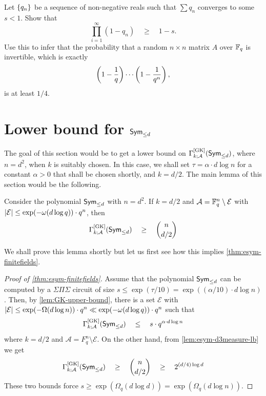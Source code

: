 \begin{exercise}
  Let $\left\{q_n\right\}$ be a sequence of non-negative reals such that $\sum q_n$ converges to some $s < 1$. 
Show that 
  \[
  \prod_{i=1}^{\infty} (1 - q_n) \quad \geq \quad 1 - s. 
  \]
  Use this to infer that the probability that a random $n\times n$ matrix $A$ over $\mathbb{F}_q$ is invertible, which is exactly
  \[
  \left(1 - \frac{1}{q}\right)\cdots \left(1 - \frac{1}{q^{n}}\right),
  \]
  is at least $1/4$. 
\end{exercise}

\section{Lower bound for $\operatorname{\mathsf{Sym}}_{\leq d}$}

The goal of this section would be to get a lower bound on $\Gamma^{\mathrm{[GK]}}_{k;\mathcal{A}}(\operatorname{\mathsf{Sym}}_{\leq d})$, where $n = d^2$, when $k$ is suitably chosen. In this case, we shall set $\tau = \alpha \cdot d \log n$ for a constant $\alpha>0$ that shall be chosen shortly, and $k = d/2$. The main lemma of this section would be the following. 

\begin{lemma}\label{lem:esym-d3measure-lb}
Consider the polynomial $\operatorname{\mathsf{Sym}}_{\leq d}$ with $n = d^2$. If $k = d/2$ and $\mathcal{A} = \mathbb{F}_q^n \setminus \mathcal{E}$ with $\left|\mathcal{E}\right| \leq \exp(-\omega(d\log q)) \cdot  q^n$, then
\[
\Gamma^{\mathrm{[GK]}}_{k;\mathcal{A}}(\operatorname{\mathsf{Sym}}_{\leq d}) \quad \geq \quad \binom{n}{d/2}
\]
\end{lemma}

\noindent
We shall prove this lemma shortly but let us first see how this implies \autoref{thm:esym-finitefields}. 

\begin{proof}[Proof of \autoref{thm:esym-finitefields}]
Assume that the polynomial $\operatorname{\mathsf{Sym}}_{\leq d}$ can be computed by a $\Sigma\Pi\Sigma$ circuit of size $s \leq \exp(\tau/10) = \exp((\alpha/10) \cdot d \log n)$. Then, by \autoref{lem:GK-upper-bound}, there is a set $\mathcal{E}$ with $\left|\mathcal{E}\right| \leq \exp(-\Omega(d\log n)) \cdot q^n \ll \exp(-\omega(d \log q)) \cdot q^n$ such that
\[
\Gamma^{\mathrm{[GK]}}_{k;\mathcal{A}}(\operatorname{\mathsf{Sym}}_{\leq d}) \quad \leq \quad s \cdot q^{\alpha\cdot d\log n}
\]
where $k = d/2$ and $\mathcal{A} = F_q^n \setminus \mathcal{E}$. On the other hand, from \autoref{lem:esym-d3measure-lb} we get
\[
\Gamma^{\mathrm{[GK]}}_{k;\mathcal{A}}(\operatorname{\mathsf{Sym}}_{\leq d}) \quad \geq \quad \binom{n}{d/2} \quad \geq \quad 2^{(d/4) \log d}
\]
These two bounds force $s \geq \exp(\Omega_q(d \log d)) = \exp(\Omega_q(d\log n))$. 
\end{proof}

